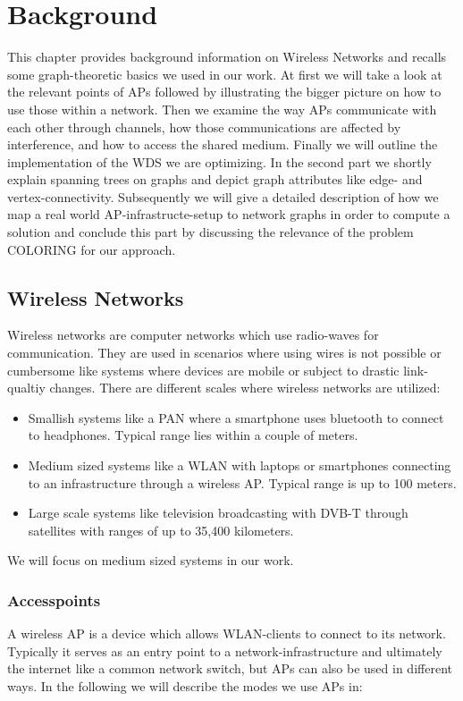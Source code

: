 \chapter{Background}
This chapter provides background information on Wireless Networks and recalls some graph-theoretic basics we used in our work.
At first we will take a look at the relevant points of APs followed by illustrating the bigger picture on how to use those
within a network. Then we examine the way APs communicate with each other through channels, how those communications are affected by interference, and
how to access the shared medium. Finally we will outline the implementation of the \ac{WDS} we are optimizing.
In the second part we shortly explain spanning trees on graphs and depict graph attributes like edge- and vertex-connectivity.
Subsequently we will give a detailed description of how we map a real world \ac{AP}-infrastructe-setup to network graphs in order 
to compute a solution and conclude this part by discussing the relevance of the problem COLORING for our approach.

\section{Wireless Networks}
  Wireless networks are computer networks which use radio-waves for communication.
  They are used in scenarios where using wires is not possible or cumbersome like systems where devices are mobile or subject to drastic link-qualtiy changes.
  There are different scales where wireless networks are utilized:
  \begin{itemize}
    \item Smallish systems like a \ac{PAN} where a smartphone uses bluetooth to connect to headphones. Typical range lies within a couple of meters.
    \item Medium sized systems like a \ac{WLAN} with laptops or smartphones connecting to an infrastructure through a wireless \ac{AP}.
      Typical range is up to 100 meters.
    \item Large scale systems like television broadcasting with \ac{DVB-T} through satellites with ranges of up to 35,400 kilometers.
  \end{itemize}
  
  We will focus on medium sized systems in our work.

  \subsection{Accesspoints}
    A wireless \ac{AP} is a device which allows \ac{WLAN}-clients to connect to its network.
    Typically it serves as an entry point to a network-infrastructure and ultimately the internet like a common network switch, 
    but APs can also be used in different ways. In the following we will describe the modes we use APs in:
    
